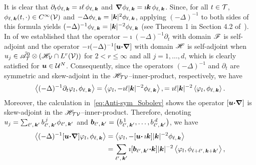 \documentclass[amsa]{ipart}
\begin{document}
It is clear that
$\partial_t\phi_{\ell,\,\boldsymbol{k}}=\imath\ell\,\phi_{\ell,\,\boldsymbol{k}}$ and
$\mbox{\boldmath${\nabla}$}\phi_{\ell,\,\boldsymbol{k}}=\imath\boldsymbol{k}\,\phi_{\ell,\,\boldsymbol{k}}$. Since, for all $t\in\mathcal{T}$,
$\phi_{\ell,\,\boldsymbol{k}}(t,\cdot)\in C^\infty(\mathcal{V})$ and 
$-\Delta\phi_{\ell,\,\boldsymbol{k}}=|\boldsymbol{k}|^2\phi_{\ell,\,\boldsymbol{k}}$, applying $(-\Delta)^{-1}$ to both
sides of this formula yields
$(-\Delta)^{-1}\phi_{\ell,\,\boldsymbol{k}}=|\boldsymbol{k}|^{-2}\phi_{\ell,\,\boldsymbol{k}}$ (see Theorem 1 in
Section 4.2 of~\cite{McOwen:2003:PDE}). In 
of  we established that the operator
$-\imath(-\Delta)^{-1}\partial_t$ with domain $\mathscr{F}$ is self-adjoint and the operator
$-\imath(-\Delta)^{-1}[\boldsymbol{u}\mbox{\boldmath${\cdot}$}\mbox{\boldmath${\nabla}$}]$ with domain $\mathscr{H}$ is self-adjoint
when $u_j\in\tilde{\mathscr{A}}^0_{\mathcal{T}}\otimes(\mathscr{H}_{\mathcal{V}}\cap L^r(\mathcal{V}))$ for $2<r\leq\infty$ and all
$j=1,\ldots,d$, which is clearly satisfied for $\boldsymbol{u}\in\mathcal{U}^N$. Consequently,
since 
the operators $(-\Delta)^{-1}$ and $\partial_t$ are symmetric and skew-adjoint in
the $\mathscr{H}_{\mathcal{T}\mathcal{V}}$--inner-product, respectively, we have
%
\begin{align}\label{eq:Fourier_Del_Dt}
  \left\langle(-\Delta)^{-1}\partial_t\varphi_l,\phi_{\ell,\,\veck}\right\rangle
  =\left\langle\varphi_l,-\imath\ell|\veck|^{-2}\phi_{\ell,\,\veck}\right\rangle,
  =\imath\ell|\veck|^{-2}\left\langle\varphi_l,\phi_{\ell,\,\veck}\right\rangle.
\end{align}
%
Moreover, the calculation in~\eqref{eq:Anti-sym_Sobolev} shows the
operator $[\boldsymbol{u}\mbox{\boldmath${\cdot}$}\mbox{\boldmath${\nabla}$}]$ is skew-adjoint in the
$\mathscr{H}_{\mathcal{T}\mathcal{V}}$--inner-product. Therefore, denoting
$u_j=\sum_{\ell^\prime,\,\boldsymbol{k}^\prime}b^{\,j}_{\ell^\prime,\,\boldsymbol{k}^\prime}\phi_{\ell^\prime,\,\boldsymbol{k}^\prime}$ and
$\boldsymbol{b}_{\ell^\prime,\,\boldsymbol{k}^\prime}=\big(b^{\,1}_{\ell^\prime,\,\boldsymbol{k}^\prime},\ldots,b^{\,d}_{\ell^\prime,\,\boldsymbol{k}^\prime}\big)$, 
we have  
%
\begin{align}\label{eq:Fourier_Del_u_grad}   
  \left\langle(-\Delta)^{-1}[\vecu\bcdot\bnabla]\varphi_l,\phi_{\ell,\,\veck}\right\rangle
  &=\left\langle\varphi_l,-[\vecu\bcdot\,\imath\veck]|\veck|^{-2}\phi_{\ell,\,\veck}\right\rangle
  \\\notag
  &=\sum_{\ell^\prime,\,\veck^\prime}
  \imath[\vecb_{\ell^\prime,\,\veck^\prime}\bcdot\veck]|\veck|^{-2}
  \left\langle\varphi_l,\phi_{\ell+\ell^\prime,\,\veck+\veck^\prime}\right\rangle,
\end{align}
\end{document}
